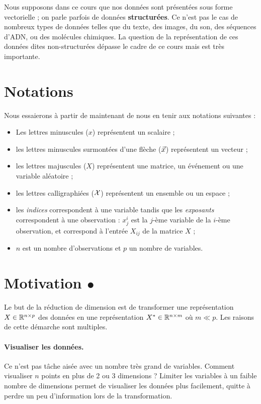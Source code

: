 Nous supposons dans ce cours que nos données sont présentées sous forme
vectorielle ; on parle parfois de données \textbf{structurées}. Ce n'est pas le
cas de nombreux types de données telles que du texte, des images, du son, des
séquences d'ADN, ou des molécules chimiques. La question de la représentation
de ces données dites non-structurées dépasse le cadre de ce cours mais est très
importante.

\section{Notations}
Nous essaierons à partir de maintenant de nous en tenir aux notations suivantes
:
\begin{itemize}
\item Les lettres minuscules ($x$) représentent un scalaire ;
\item les lettres minuscules surmontées d'une flèche ($\xx$) représentent un
  vecteur ;
\item les lettres majuscules ($X$) représentent une matrice, un événement ou
  une variable aléatoire ;
\item les lettres calligraphiées ($\mathcal{X}$) représentent un ensemble ou un espace ;
\item les {\it indices} correspondent à une variable tandis que les {\it
    exposants} correspondent à une observation : $x^i_j$ est la $j$-ème
  variable de la $i$-ème observation, et correspond à l'entrée $X_{ij}$ de la
  matrice $X$ ;
\item $n$ est un nombre d'observations et $p$ un nombre de variables.
\end{itemize}

\section{Motivation $\bullet$}
Le but de la réduction de dimension est de transformer une représentation
$X \in \mathbb{R}^{n \times p}$ des données en une représentation
$X^* \in \mathbb{R}^{n \times m}$ où $m \ll p$. Les raisons de cette démarche sont
multiples.

\paragraph{Visualiser les données.} Ce n'est pas tâche aisée avec un nombre
très grand de variables. Comment visualiser $n$ points en plus de 2 ou 3
dimensions ? Limiter les variables à un faible nombre de dimensions permet de
visualiser les données plus facilement, quitte à perdre un peu d'information
lors de la transformation.

